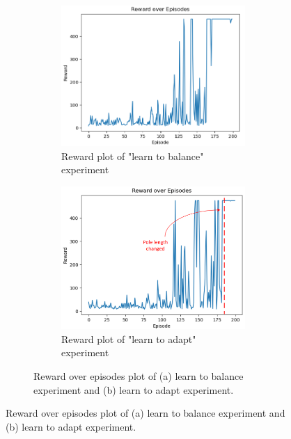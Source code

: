 \documentclass[10pt,a4paper]{article}
\begin{document}
\begin{figure}[H]
	\begin{figure}[H]
		\centering
		\begin{subfigure}[b]{0.48\textwidth}
			\centering
			\includegraphics[width=1\linewidth]{figure/200_iterations}
			\caption{Reward plot of "learn to balance" experiment}
			\label{fig:reward_1}
		\end{subfigure}
		\hfill
		\begin{subfigure}[b]{0.48\textwidth}
			\centering
			\includegraphics[width=1\linewidth]{figure/pole_changed}
			\caption{Reward plot of "learn to adapt" experiment}
			\label{fig:reward_2}
		\end{subfigure}
		\caption{Reward over episodes plot of (a) learn to balance experiment and (b) learn to adapt experiment. }
		\label{fig:reward}
	\end{figure}
	

\end{figure}
\end{document}

